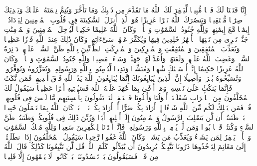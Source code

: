 \stopbuffer%
\startbuffer[\q:48:1]
إِنَّا فَتَحۡنَا لَكَ فَتۡحࣰا مُّبِینࣰا%
\stopbuffer%
\startbuffer[\q:48:2]
لِّیَغۡفِرَ لَكَ ٱللَّهُ مَا تَقَدَّمَ مِن ذَنۢبِكَ وَمَا تَأَخَّرَ وَیُتِمَّ نِعۡمَتَهُۥ عَلَیۡكَ وَیَهۡدِیَكَ صِرَٰطࣰا مُّسۡتَقِیمࣰا%
\stopbuffer%
\startbuffer[\q:48:3]
وَیَنصُرَكَ ٱللَّهُ نَصۡرًا عَزِیزًا%
\stopbuffer%
\startbuffer[\q:48:4]
هُوَ ٱلَّذِیۤ أَنزَلَ ٱلسَّكِینَةَ فِی قُلُوبِ ٱلۡمُؤۡمِنِینَ لِیَزۡدَادُوۤا۟ إِیمَٰنࣰا مَّعَ إِیمَٰنِهِمۡۗ وَلِلَّهِ جُنُودُ ٱلسَّمَٰوَٰتِ وَٱلۡأَرۡضِۚ وَكَانَ ٱللَّهُ عَلِیمًا حَكِیمࣰا%
\stopbuffer%
\startbuffer[\q:48:5]
لِّیُدۡخِلَ ٱلۡمُؤۡمِنِینَ وَٱلۡمُؤۡمِنَٰتِ جَنَّٰتࣲ تَجۡرِی مِن تَحۡتِهَا ٱلۡأَنۡهَٰرُ خَٰلِدِینَ فِیهَا وَیُكَفِّرَ عَنۡهُمۡ سَیِّءَاتِهِمۡۚ وَكَانَ ذَٰلِكَ عِندَ ٱللَّهِ فَوۡزًا عَظِیمࣰا%
\stopbuffer%
\startbuffer[\q:48:6]
وَیُعَذِّبَ ٱلۡمُنَٰفِقِینَ وَٱلۡمُنَٰفِقَٰتِ وَٱلۡمُشۡرِكِینَ وَٱلۡمُشۡرِكَٰتِ ٱلظَّاۤنِّینَ بِٱللَّهِ ظَنَّ ٱلسَّوۡءِۚ عَلَیۡهِمۡ دَاۤئِرَةُ ٱلسَّوۡءِۖ وَغَضِبَ ٱللَّهُ عَلَیۡهِمۡ وَلَعَنَهُمۡ وَأَعَدَّ لَهُمۡ جَهَنَّمَۖ وَسَاۤءَتۡ مَصِیرࣰا%
\stopbuffer%
\startbuffer[\q:48:7]
وَلِلَّهِ جُنُودُ ٱلسَّمَٰوَٰتِ وَٱلۡأَرۡضِۚ وَكَانَ ٱللَّهُ عَزِیزًا حَكِیمًا%
\stopbuffer%
\startbuffer[\q:48:8]
إِنَّاۤ أَرۡسَلۡنَٰكَ شَٰهِدࣰا وَمُبَشِّرࣰا وَنَذِیرࣰا%
\stopbuffer%
\startbuffer[\q:48:9]
لِّتُؤۡمِنُوا۟ بِٱللَّهِ وَرَسُولِهِۦ وَتُعَزِّرُوهُ وَتُوَقِّرُوهُۚ وَتُسَبِّحُوهُ بُكۡرَةࣰ وَأَصِیلًا%
\stopbuffer%
\startbuffer[\q:48:10]
إِنَّ ٱلَّذِینَ یُبَایِعُونَكَ إِنَّمَا یُبَایِعُونَ ٱللَّهَ یَدُ ٱللَّهِ فَوۡقَ أَیۡدِیهِمۡۚ فَمَن نَّكَثَ فَإِنَّمَا یَنكُثُ عَلَىٰ نَفۡسِهِۦۖ وَمَنۡ أَوۡفَىٰ بِمَا عَٰهَدَ عَلَیۡهُ ٱللَّهَ فَسَیُؤۡتِیهِ أَجۡرًا عَظِیمࣰا%
\stopbuffer%
\startbuffer[\q:48:11]
سَیَقُولُ لَكَ ٱلۡمُخَلَّفُونَ مِنَ ٱلۡأَعۡرَابِ شَغَلَتۡنَاۤ أَمۡوَٰلُنَا وَأَهۡلُونَا فَٱسۡتَغۡفِرۡ لَنَاۚ یَقُولُونَ بِأَلۡسِنَتِهِم مَّا لَیۡسَ فِی قُلُوبِهِمۡۚ قُلۡ فَمَن یَمۡلِكُ لَكُم مِّنَ ٱللَّهِ شَیۡءًا إِنۡ أَرَادَ بِكُمۡ ضَرًّا أَوۡ أَرَادَ بِكُمۡ نَفۡعَۢاۚ بَلۡ كَانَ ٱللَّهُ بِمَا تَعۡمَلُونَ خَبِیرَۢا%
\stopbuffer%
\startbuffer[\q:48:12]
بَلۡ ظَنَنتُمۡ أَن لَّن یَنقَلِبَ ٱلرَّسُولُ وَٱلۡمُؤۡمِنُونَ إِلَىٰۤ أَهۡلِیهِمۡ أَبَدࣰا وَزُیِّنَ ذَٰلِكَ فِی قُلُوبِكُمۡ وَظَنَنتُمۡ ظَنَّ ٱلسَّوۡءِ وَكُنتُمۡ قَوۡمَۢا بُورࣰا%
\stopbuffer%
\startbuffer[\q:48:13]
وَمَن لَّمۡ یُؤۡمِنۢ بِٱللَّهِ وَرَسُولِهِۦ فَإِنَّاۤ أَعۡتَدۡنَا لِلۡكَٰفِرِینَ سَعِیرࣰا%
\stopbuffer%
\startbuffer[\q:48:14]
وَلِلَّهِ مُلۡكُ ٱلسَّمَٰوَٰتِ وَٱلۡأَرۡضِۚ یَغۡفِرُ لِمَن یَشَاۤءُ وَیُعَذِّبُ مَن یَشَاۤءُۚ وَكَانَ ٱللَّهُ غَفُورࣰا رَّحِیمࣰا%
\stopbuffer%
\startbuffer[\q:48:15]
سَیَقُولُ ٱلۡمُخَلَّفُونَ إِذَا ٱنطَلَقۡتُمۡ إِلَىٰ مَغَانِمَ لِتَأۡخُذُوهَا ذَرُونَا نَتَّبِعۡكُمۡۖ یُرِیدُونَ أَن یُبَدِّلُوا۟ كَلَٰمَ ٱللَّهِۚ قُل لَّن تَتَّبِعُونَا كَذَٰلِكُمۡ قَالَ ٱللَّهُ مِن قَبۡلُۖ فَسَیَقُولُونَ بَلۡ تَحۡسُدُونَنَاۚ بَلۡ كَانُوا۟ لَا یَفۡقَهُونَ إِلَّا قَلِیلࣰا%
